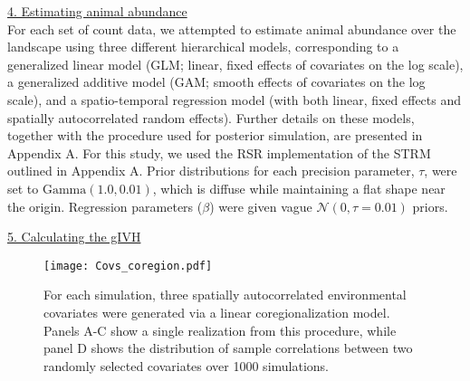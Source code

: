 \documentclass[12pt,fleqn]{article}
\begin{document}
\begin{flushleft}
\underline{4. Estimating animal abundance} \\

For each set of count data, we attempted to estimate animal abundance over the landscape using three different hierarchical models, corresponding to a generalized linear model (GLM; linear, fixed effects of covariates on the log scale), a generalized additive model (GAM; smooth effects of covariates on the log scale), and a spatio-temporal regression model (with both linear, fixed effects and spatially autocorrelated random effects).  Further details on these models, together with the procedure used for posterior simulation, are presented in Appendix A.  For this study, we used the RSR implementation of the STRM outlined in Appendix A.  Prior distributions for each precision parameter, $\tau$, were set to $\text{Gamma}(1.0,0.01)$, which is diffuse while maintaining a flat shape near the origin.  Regression parameters ($\beta$) were given vague $\mathcal{N}(0,\tau=0.01)$ priors.


\underline{5. Calculating the gIVH} \\

\renewcommand{\refname}{Literature Cited}




\end{flushleft}

\begin{figure}[!h]
\begin{center}
\texttt{[image: Covs\_coregion.pdf]}
\end{center}
\caption{For each simulation, three spatially autocorrelated environmental covariates were generated via a linear coregionalization model.  Panels A-C show a single realization from this procedure, while panel D shows the distribution of sample correlations between two randomly selected covariates over 1000 simulations.}
\label{fig:covs}
\end{figure}
\end{document}

